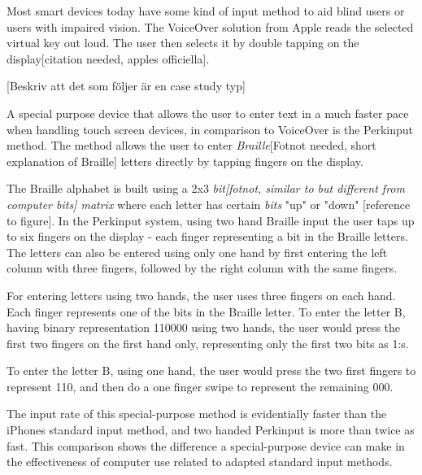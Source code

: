 
Most smart devices today have some kind of input method to aid blind users or users with impaired vision. The VoiceOver solution from Apple reads the selected virtual key out loud. The user then selects it by double tapping on the display[citation needed, apples officiella].

[Beskriv att det som följer är en case study typ]

A special purpose device that allows the user to enter text in a much faster pace when handling touch screen devices, in comparison to VoiceOver is the Perkinput method\cite{azenkot}. The method allows the user to enter \emph{Braille}[Fotnot needed, short explanation of Braille] letters directly by tapping fingers on the display.

The Braille alphabet is built using a 2x3 \emph{bit[fotnot, similar to but different from computer bits] matrix} where each letter has certain \emph{bits} "up" or "down" [reference to figure]. In the Perkinput system, using two hand Braille input the user taps up to six fingers on the display - each finger representing a bit in the Braille letters. The letters can also be entered using only one hand by first entering the left column with three fingers, followed by the right column with the same fingers.

For entering letters using two hands, the user uses three fingers on each hand. Each finger represents one of the bits in the Braille letter. To enter the letter B, having binary representation 110000 using two hands, the user would press the first two fingers on the first hand only, representing only the first two bits as 1:s.

To enter the letter B, using one hand, the user would press the two first fingers to represent 110, and then do a one finger swipe to represent the remaining 000.

The input rate of this special-purpose method is evidentially faster than the iPhones standard input method\cite{azenkot}, and two handed Perkinput is more than twice as fast. This comparison shows the difference a special-purpose device can make in the effectiveness of computer use related to adapted standard input methods. 

